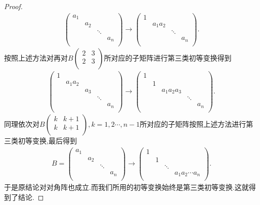 \documentclass[../../main.tex]{subfiles}
\begin{document}
\begin{proof}
\begin{align*}
\left( \begin{matrix}
a_1&		&		&		\\
&		a_2&		&		\\
&		&		\ddots&		\\
&		&		&		a_n\\
\end{matrix} \right) \longrightarrow \left( \begin{matrix}
1&		&		&		\\
&		a_1a_2&		&		\\
&		&		\ddots&		\\
&		&		&		a_n\\
\end{matrix} \right) .
\end{align*}
按照上述方法对再对$B\left( \begin{matrix}
2&		3\\
2&		3\\
\end{matrix} \right) $所对应的子矩阵进行第三类初等变换得到
\begin{align*}
\left( \begin{matrix}
1&		&		&		&		\\
&		a_1a_2&		&		&		\\
&		&		a_3&		&		\\
&		&		&		\ddots&		\\
&		&		&		&		a_n\\
\end{matrix} \right) \longrightarrow \left( \begin{matrix}
1&		&		&		&		\\
&		1&		&		&		\\
&		&		a_1a_2a_3&		&		\\
&		&		&		\ddots&		\\
&		&		&		&		a_n\\
\end{matrix} \right) .
\end{align*}
同理依次对$B\left( \begin{matrix}
k&		k+1\\
k&		k+1\\
\end{matrix} \right),k=1,2\cdots,n-1$所对应的子矩阵按照上述方法进行第三类初等变换,最后得到
\begin{align*}
B=\left( \begin{matrix}
a_1&		&		&		\\
&		a_2&		&		\\
&		&		\ddots&		\\
&		&		&		a_n\\
\end{matrix} \right) \longrightarrow \left( \begin{matrix}
1&		&		&		\\
&		1&		&		\\
&		&		\ddots&		\\
&		&		&		a_1a_2\cdots a_n\\
\end{matrix} \right) .
\end{align*}
于是原结论对对角阵也成立.而我们所用的初等变换始终是第三类初等变换.这就得到了结论.
\end{proof}
\end{document}
